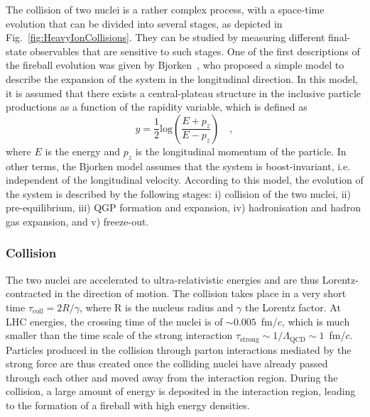 The collision of two nuclei is a rather complex process, with a space-time evolution that can be divided into several stages, as depicted in Fig.~\ref{fig:HeavyIonCollisions}. They can be studied by measuring different final-state observables that are sensitive to such stages. One of the first descriptions of the fireball evolution was given by Bjorken~\cite{Bjorken:1982qr}, who proposed a simple model to describe the expansion of the system in the longitudinal direction. In this model, it is assumed that there exists a central-plateau structure in the inclusive particle productions as a function of the rapidity variable, which is defined as 
\begin{equation*}
    y = \frac{1}{2}\mathrm{log}\left(\frac{E+p_z}{E-p_z}\right)\quad ,
\end{equation*}
where $E$ is the energy and $p_z$ is the longitudinal momentum of the particle. In other terms, the Bjorken model assumes that the system is boost-invariant, i.e. independent of the longitudinal velocity. According to this model, the evolution of the system is described by the following stages: i) collision of the two nuclei, ii) pre-equilibrium, iii) QGP formation and expansion, iv) hadronisation and hadron gas expansion, and v) freeze-out.

\subsubsection{Collision}
The two nuclei are accelerated to ultra-relativistic energies and are thus Lorentz-contracted in the direction of motion. The collision takes place in a very short time $\tau_\mathrm{coll} = 2R/\gamma$, where R is the nucleus radius and $\gamma$ the Lorentz factor. At LHC energies, the crossing time of the nuclei is of $\sim 0.005$~fm/$c$, which is much smaller than the time scale of the strong interaction $\tau_\mathrm{strong} \sim 1/\Lambda_\mathrm{QCD} \sim 1$~fm/$c$. Particles produced in the collision through parton interactions mediated by the strong force are thus created once the colliding nuclei have already passed through each other and moved away from the interaction region. During the collision, a large amount of energy is deposited in the interaction region, leading to the formation of a fireball with high energy densities.

